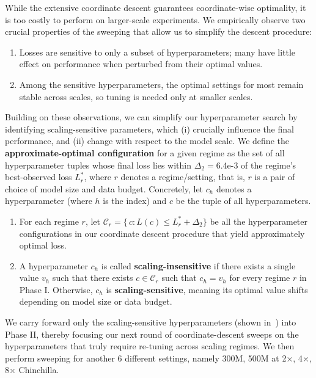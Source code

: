While the extensive coordinate descent guarantees coordinate-wise optimality, it is too costly to perform on larger-scale experiments.
We empirically observe two crucial properties of the sweeping that allow us to simplify the descent procedure:





\begin{enumerate}
    \item Losses are sensitive to only a subset of hyperparameters; many have little effect on performance when perturbed from their optimal values.
    \item Among the sensitive hyperparameters, the optimal settings for most remain stable across scales, so tuning is needed only at smaller scales.
\end{enumerate}




Building on these observations, we can simplify our hyperparameter search by identifying scaling-sensitive parameters, which (i) crucially influence the final performance, and (ii) change with respect to the model scale.
We define the \textbf{approximate-optimal configuration} for a given regime as the set of all hyperparameter tuples whose final loss lies within $\Delta_2=$6.4e-3 of the regime's best-observed loss $L^*_r$, where $r$ denotes a regime/setting, that is, $r$ is a pair of choice of model size and data budget. Concretely, let $c_h$ denotes a hyperparameter (where $h$ is the index) and $c$ be the tuple of all hyperparameters.
\begin{enumerate}[leftmargin=*]
    \item For each regime $r$, let $\mathcal{C}_r = \{\,c: L(c)\le L^*_r + \Delta_2\}$ be all the hyperparameter configurations in our coordinate descent procedure that yield approximately optimal loss. 
    \item A hyperparameter $c_h$ is called \textbf{scaling-insensitive} if there exists a single value $v_h$ such that there exists  $c\in\mathcal{C}_r$ such that $c_h=v_h$  for every regime $r$ in Phase I. 
    Otherwise, $c_h$ is \textbf{scaling-sensitive}, meaning its optimal value shifts depending on model size or data budget.
\end{enumerate}

We carry forward only the scaling-sensitive hyperparameters (shown in~) into Phase II, thereby focusing our next round of coordinate-descent sweeps on the hyperparameters that truly require re-tuning across scaling regimes.
We then perform sweeping for another 6 different settings, namely 300M, 500M at 2×, 4×, 8× Chinchilla. 

